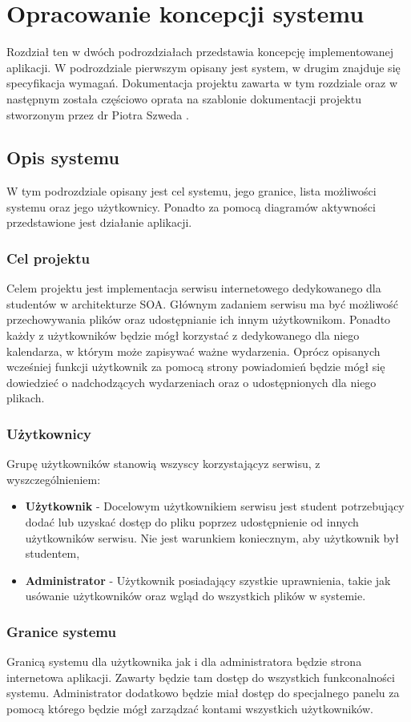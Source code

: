 \chapter{Opracowanie koncepcji systemu}
\label{cha:koncepcjaSystemu}
Rozdział ten w dwóch podrozdziałach przedstawia koncepcję implementowanej aplikacji. W podrozdziale pierwszym opisany jest system, w drugim znajduje się specyfikacja wymagań. Dokumentacja projektu zawarta w tym rozdziale oraz w następnym została częściowo oprata na szablonie dokumentacji projektu stworzonym przez dr Piotra Szweda \cite{DOC01}.
\section{Opis systemu}
W tym podrozdziale opisany jest cel systemu, jego granice, lista możliwości systemu oraz jego użytkownicy. Ponadto za pomocą diagramów aktywności przedstawione jest działanie aplikacji.
\subsection{Cel projektu}
Celem projektu jest implementacja serwisu internetowego dedykowanego dla studentów w architekturze SOA. Głównym zadaniem serwisu ma być możliwość przechowywania plików oraz udostępnianie ich innym użytkownikom. Ponadto każdy z użytkowników będzie mógł korzystać z dedykowanego dla niego kalendarza, w którym może zapisywać ważne wydarzenia. Oprócz opisanych wcześniej funkcji użytkownik za pomocą strony powiadomień będzie mógł się dowiedzieć o nadchodzących wydarzeniach oraz o udostępnionych dla niego plikach.

\subsection{Użytkownicy}
Grupę użytkowników stanowią wszyscy korzystającyz serwisu, z wyszczególnieniem:
\begin{itemize}
	\item \textbf{Użytkownik} - Docelowym użytkownikiem serwisu jest student potrzebujący dodać lub uzyskać dostęp do pliku poprzez udostępnienie od innych użytkowników serwisu. Nie jest warunkiem koniecznym, aby użytkownik był studentem,
	\item \textbf{Administrator} - Użytkownik posiadający szystkie uprawnienia, takie jak usówanie użytkowników oraz wgląd do wszystkich plików w systemie.
\end{itemize}

\subsection{Granice systemu}
Granicą systemu dla użytkownika jak i dla administratora będzie strona internetowa aplikacji. Zawarty będzie tam dostęp do wszystkich funkconalności systemu. Administrator dodatkowo będzie miał dostęp do specjalnego panelu za pomocą którego będzie mógł zarządzać kontami wszystkich użytkowników.

